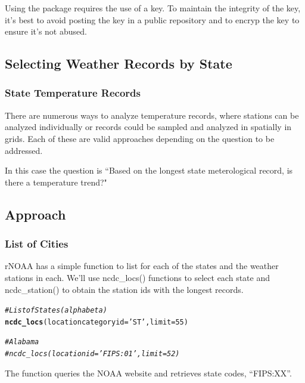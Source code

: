 \documentclass{article}\usepackage[]{graphicx}\usepackage[]{color}
\makeatletter
\newcommand{\hlnum}[1]{\textcolor[rgb]{0.686,0.059,0.569}{#1}}%
\newcommand{\hlstr}[1]{\textcolor[rgb]{0.192,0.494,0.8}{#1}}%
\newcommand{\hlcom}[1]{\textcolor[rgb]{0.678,0.584,0.686}{\textit{#1}}}%
\newcommand{\hlstd}[1]{\textcolor[rgb]{0.345,0.345,0.345}{#1}}%
\newcommand{\hlkwc}[1]{\textcolor[rgb]{0.333,0.667,0.333}{#1}}%
\newcommand{\hlkwd}[1]{\textcolor[rgb]{0.737,0.353,0.396}{\textbf{#1}}}%
\newenvironment{kframe}{%
 \def\at@end@of@kframe{}%
 \ifinner\ifhmode%
  \def\at@end@of@kframe{\end{minipage}}%
  \begin{minipage}{\columnwidth}%
 \fi\fi%
 \def\FrameCommand##1{\hskip\@totalleftmargin \hskip-\fboxsep
 \colorbox{shadecolor}{##1}\hskip-\fboxsep
     \hskip-\linewidth \hskip-\@totalleftmargin \hskip\columnwidth}%
 \MakeFramed {\advance\hsize-\width
   \@totalleftmargin\z@ \linewidth\hsize
   \@setminipage}}%
 {\par\unskip\endMakeFramed%
 \at@end@of@kframe}
\newenvironment{knitrout}{}{} %
\makeatother
\begin{document}
Using the package requires the use of a key. To maintain the integrity of the key, it's best to avoid posting the key in a public repository and to encryp the key to ensure it's not abused. 

\subsection{Selecting Weather Records by State}

\subsubsection{State Temperature Records}

There are numerous ways to analyze temperature records, where stations can be analyzed individually or records could be sampled and analyzed in spatially in grids. Each of these are valid approaches depending on the question to be addressed. 

In this case the question is ``Based on the longest state meterological record, is there a temperature trend?"

\subsection{Approach}

\subsubsection{List of Cities}

rNOAA has a simple function to list for each of the states and the weather stations in each. We'll use ncdc\_locs() functions to select each state and ncdc\_station() to obtain the station ids with the longest records. 

\begin{knitrout}
\color{fgcolor}\begin{kframe}
\begin{alltt}
\hlcom{# List of States (alpha beta)}
\hlkwd{ncdc_locs}\hlstd{(}\hlkwc{locationcategoryid}\hlstd{=}\hlstr{'ST'}\hlstd{,} \hlkwc{limit}\hlstd{=}\hlnum{55}\hlstd{)}

\hlcom{# Alabama }
\hlcom{# ncdc_locs(locationid='FIPS:01', limit=52)}
\end{alltt}
\end{kframe}
\end{knitrout}

The function queries the NOAA website and retrieves state codes, ``FIPS:XX''.  
\end{document}
